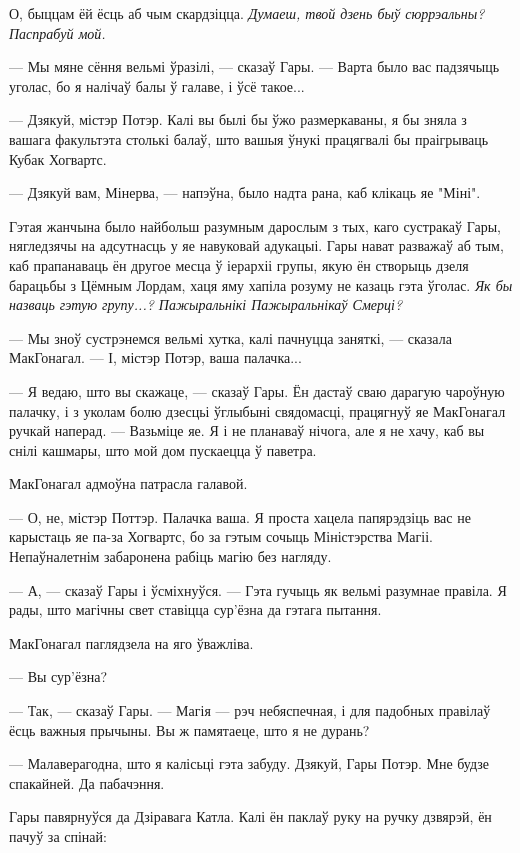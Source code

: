 О, быццам ёй ёсць аб чым скардзіцца. \emph{Думаеш, твой дзень быў сюррэальны? 
Паспрабуй мой.}

--- Мы мяне сёння вельмі ўразілі, --- сказаў Гары. --- Варта было вас падзячыць 
уголас, бо я налічаў балы ў галаве, і ўсё такое...

--- Дзякуй, містэр Потэр. Калі вы былі бы ўжо размеркаваны, я бы зняла з 
вашага факультэта столькі балаў, што вашыя ўнукі працягвалі бы праігрываць
Кубак Хогвартс. 

--- Дзякуй вам, Мінерва, --- напэўна, было надта рана, каб клікаць яе
"Міні".

Гэтая жанчына было найбольш разумным дарослым з тых, каго сустракаў Гары,
нягледзячы на адсутнасць у яе навуковай адукацыі. Гары нават разважаў аб тым,
каб прапанаваць ён другое месца ў іерархіі групы, якую ён створыць дзеля
барацьбы з Цёмным Лордам, хаця яму хапіла розуму не казаць гэта ўголас.
\emph{Як бы назваць гэтую групу...? Пажыральнікі Пажыральнікаў Смерці?}

--- Мы зноў сустрэнемся вельмі хутка, калі пачнуцца заняткі, --- сказала
МакГонагал. --- І, містэр Потэр, ваша палачка...

--- Я ведаю, што вы скажаце, --- сказаў Гары. Ён дастаў сваю дарагую чароўную
палачку, і з уколам болю дзесцьі ўглыбыні свядомасці, працягнуў яе МакГонагал
ручкай наперад. --- Вазьміце яе. Я і не планаваў нічога, але я не хачу, каб
вы снілі кашмары, што мой дом пускаецца ў паветра.

МакГонагал адмоўна патрасла галавой. 

--- О, не, містэр Поттэр. Палачка ваша. Я проста хацела папярэдзіць вас не 
карыстаць яе па-за Хогвартс, бо за гэтым сочыць Міністэрства Магіі. Непаўналетнім
забаронена рабіць магію без нагляду.

--- А, --- сказаў Гары і ўсміхнуўся. --- Гэта гучыць як вельмі разумнае правіла.
Я рады, што магічны свет ставіцца сур'ёзна да гэтага пытання.

МакГонагал паглядзела на яго ўважліва. 

--- Вы сур'ёзна?

--- Так, --- сказаў Гары. --- Магія --- рэч небяспечная, і для падобных правілаў
ёсць важныя прычыны. Вы ж памятаеце, што я не дурань?

--- Малаверагодна, што я калісьці гэта забуду. Дзякуй, Гары Потэр. Мне будзе
спакайней. Да пабачэння.

Гары павярнуўся да Дзіравага Катла. Калі ён паклаў руку на ручку дзвярэй,
ён пачуў за спінай:

